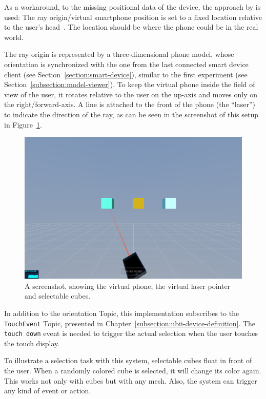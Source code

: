 As a workaround, to the missing positional data of the device, the approach by \citeauthor{Pietroszek.2014} is used: The ray origin/virtual smartphone position is set to a fixed location relative to the user's head~\cite[Figure 3]{Pietroszek.2014}. The location should be where the phone could be in the real world.

The ray origin is represented by a three-dimensional phone model, whose orientation is synchronized with the one from the last connected smart device client (see Section~\ref{section:smart-device}), similar to the first experiment (see Section~\ref{subsection:model-viewer}). To keep the virtual phone inside the field of view of the user, it rotates relative to the user on the up-axis and moves only on the right/forward-axis.
A line is attached to the front of the phone (the \enquote{laser}) to indicate the direction of the ray, as can be seen in the screenshot of this setup in Figure~\ref{fig:screenshot-exp-lp}.

\begin{figure}[H]
	\centering
	\includegraphics[width=12cm]{figures/implementation/screenshot_exp_lp.png}
	\caption[Screenshot of the laser pointer]{A screenshot, showing the virtual phone, the virtual laser pointer and selectable cubes.}\label{fig:screenshot-exp-lp}
\end{figure}

In addition to the orientation Topic, this implementation subscribes to the \lstinline{TouchEvent} Topic, presented in Chapter~\ref{subsection:ubii-device-definition}. The \lstinline{touch down} event is needed to trigger the actual selection when the user touches the touch display.

To illustrate a selection task with this system, selectable cubes float in front of the user. 
When a randomly colored cube is selected, it will change its color again. This works not only with cubes but with any mesh. Also, the system can trigger any kind of event or action.


